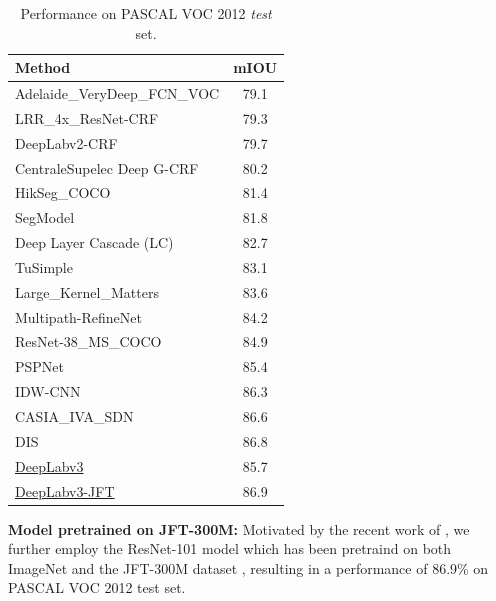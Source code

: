 \begin{table}[!t]
  \centering
  \addtolength{\tabcolsep}{2.5pt}
  \begin{tabular}{l | c}
    \toprule[0.2 em]
    {\bf Method} & {\bf mIOU} \\
    \toprule[0.2 em]
    Adelaide\_VeryDeep\_FCN\_VOC \cite{wu2016bridging} & 79.1 \\
    LRR\_4x\_ResNet-CRF \cite{ghiasi2016laplacian} & 79.3 \\
    DeepLabv2-CRF \cite{chen2016deeplab} & 79.7 \\
    CentraleSupelec Deep G-CRF \cite{chandra2016fast} & 80.2 \\
    HikSeg\_COCO \cite{sun2016mixed} & 81.4 \\
    SegModel \cite{shen2017semantic} & 81.8 \\
    Deep Layer Cascade (LC) \cite{li2017not} & 82.7 \\
    TuSimple \cite{wang2017understanding} & 83.1 \\
    Large\_Kernel\_Matters \cite{peng2017large} & 83.6 \\
    Multipath-RefineNet \cite{lin2016refinenet} & 84.2 \\
    ResNet-38\_MS\_COCO \cite{wu2016wider} & 84.9 \\
    PSPNet \cite{zhao2016pyramid} & 85.4 \\
    IDW-CNN \cite{wanglearning}  & 86.3 \\
    CASIA\_IVA\_SDN \cite{fu2017stacked} & 86.6 \\
    DIS \cite{luo2017deep} & 86.8 \\
    \midrule
    \href{http://host.robots.ox.ac.uk:8080/anonymous/EGZFFR.html}{DeepLabv3} & 85.7 \\
    \href{http://host.robots.ox.ac.uk:8080/anonymous/BDPJA4.html}{DeepLabv3-JFT} & 86.9 \\
    \bottomrule[0.1 em]
  \end{tabular}
  \caption{Performance on PASCAL VOC 2012 {\it test} set.}
  \label{tab:res_testset}
\end{table}

\textbf{Model pretrained on JFT-300M:} Motivated by the recent work of \cite{sun2017revisiting}, we further employ the ResNet-101 model which has been pretraind on both ImageNet and the JFT-300M dataset \cite{hinton2015distilling, chollet2016xception, sun2017revisiting}, resulting in a performance of 86.9\% on PASCAL VOC 2012 test set.
